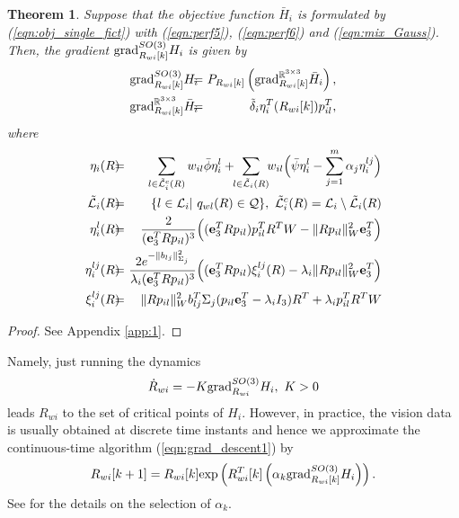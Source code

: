 \documentclass[conference,letterpaper]{ieeeconf}
\newtheorem{theorem}{Theorem}
\newcommand{\grad}{{\rm grad}}
\newcommand{\Q}{{\mathcal Q}}
\newcommand{\R}{{\mathbb R}}
\newcommand{\ewi}{R_{wi}}
\renewcommand{\L}{{\cal L}}
\begin{document}
\begin{theorem}
Suppose that the objective function $\bar H_i$ is formulated by (\ref{eqn:obj_single_fict})
with (\ref{eqn:perf5}), (\ref{eqn:perf6}) and (\ref{eqn:mix_Gauss}).
Then, the gradient $\grad_{\ewi[k]}^{SO(3)} H_i$ 
is given by 
\begin{eqnarray}
\grad_{\ewi[k]}^{SO(3)} H_i \!\!&\!\!=\!\!&\!\! 
P_{\ewi[k]}\left(\grad_{\ewi[k]}^{\R^{3\times 3}} \bar H_i\right),
\label{eqn:proj2}\\
\grad_{\ewi[k]}^{\R^{3\times 3}} \bar H_i \!\!&\!\!=\!\!&\!\!
\tilde \delta_i 
\eta_i^T(\ewi[k]) p_{il}^T,
 \nonumber
\end{eqnarray}
where
\begin{eqnarray}
\eta_i(R) \!\!&\!\!=\!\!&\!\!\!\!
\sum_{l \in \tilde \L_i^c(R)}w_{il}
\bar{\phi}  \eta_i^l+\!\!
\sum_{l \in \tilde \L_i(R)}\!\! w_{il}
\Big(
\bar{\psi} \eta_i^l
- \sum_{j=1}^m \alpha_j \eta_{i}^{lj}
\Big)
\nonumber\\
\tilde \L_i(R) \!\!&\!\!=\!\!&\!\! 
\{l \in \L_i|\ q_{wl}(R) \in \Q\},\ 
\tilde \L_i^c(R)  =  \L_i\setminus \tilde \L_i(R)
\nonumber\\
\eta_i^l(R) \!\!&\!\!=\!\!&\!\! \frac{2}{({\bf e}_3^T R p_{il})^3}
\Big(
({\bf e}_3^T R p_{il})p_{il}^TR^TW
- \|Rp_{il}\|_W^2 {\bf e}_3^T
\Big)
\nonumber\\
\eta_{i}^{lj}(R) \!\!&\!\!=\!\!&\!\!
\frac{2e^{-\|b_{lj}\|^2_{\Sigma_j}}}
{\lambda_i({\bf e}_3^TR p_{il})^3}
\Big(({\bf e}_3^TR p_{il})\xi^{lj}_i(R)
-\lambda_i\|Rp_{il}\|_W^2{\bf e}_3^T
\Big)
\nonumber\\
\xi^{lj}_i(R) \!\!&\!\!=\!\!&\!\!
 \|Rp_{il}\|_W^2b_{lj}^T \Sigma_j (p_{il} {\bf e}_3^T - \lambda_i I_3)R^T
+ \lambda_i p_{il}^TR^TW
\nonumber
\end{eqnarray}
\end{theorem}


\begin{proof}
See Appendix \ref{app:1}.
\end{proof}



Namely, just running the dynamics 
\begin{equation}
\dot{R}_{wi} = - K \grad_{\ewi}^{SO(3)}  H_i,\ K > 0
\label{eqn:grad_descent1}
\end{equation}
leads $\ewi$ to the set of critical points of $H_i$.
However, in practice, 
the vision data is usually obtained at discrete time instants
and hence 
we approximate the continuous-time algorithm (\ref{eqn:grad_descent1}) by
\begin{eqnarray}
{R}_{wi}[k+1] = \ewi[k]{\rm exp}\left(\ewi^T[k] \left(\alpha_k \grad_{\ewi[k]}^{SO(3)} H_i\right)\right).
\label{eqn:grad_descent2}
\end{eqnarray}
See \cite{AMS_BK} for the details on the selection of $\alpha_k$.
\end{document}
